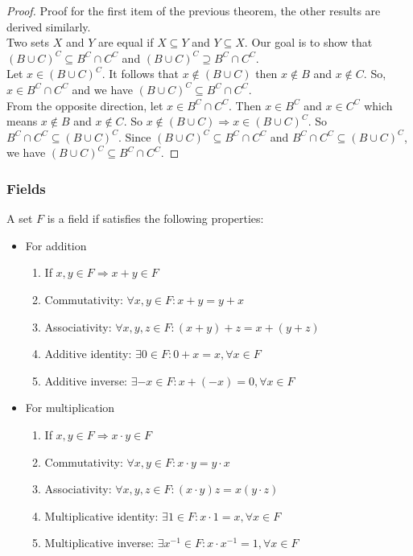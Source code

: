 \begin{proof}
    Proof for the first item of the previous theorem, the other results are derived similarly.\\
    Two sets $X$ and $Y$ are equal if $X \subseteq Y$ and $Y \subseteq X$. Our goal is to show that $(B \cup C)^C \subseteq B^C \cap C^C$ and $(B \cup C)^C \supseteq B^C \cap C^C$. \\
    Let $x \in (B \cup C)^C$. It follows that $x \notin (B \cup C)$ then $x \notin B$ and $x \notin C$. So, $x \in B^C \cap C^C$ and we have $(B \cup C)^C \subseteq B^C \cap C^C$. \\
    From the opposite direction, let  $x \in B^C \cap C^C$. Then $x \in B^C$ and $x \in C^C$ which means $x \notin B$ and $x \notin C$. So $x \notin (B \cup C) \Rightarrow x \in (B \cup C)^C$. So $B^C \cap C^C \subseteq (B \cup C)^C$.
    Since $(B \cup C)^C \subseteq B^C \cap C^C$ and $B^C \cap C^C \subseteq (B \cup C)^C$, we have $(B \cup C)^C \subseteq B^C \cap C^C$.
\end{proof}

\subsubsection{Fields}

\begin{definition}[Field]
    A set $F$ is a field if satisfies the following properties:
    \begin{itemize}
        \item For addition
            \begin{enumerate}
                \item If $x, y \in F \Rightarrow x + y \in F$
                \item Commutativity: $\forall x, y \in F: x + y = y + x$
                \item Associativity: $\forall x, y, z \in F: (x+y) + z = x + (y + z)$
                \item Additive identity: $\exists 0 \in F: 0 + x = x, \forall x \in F$
                \item Additive inverse: $\exists -x \in F: x + (-x) = 0, \forall x \in F$
            \end{enumerate}
        \item For multiplication
            \begin{enumerate}
                \item If $x, y \in F \Rightarrow x \cdot y \in F$
                \item Commutativity: $\forall x, y \in F: x \cdot y = y \cdot x$
                \item Associativity: $\forall x,y, z \in F: (x\cdot y) z = x (y \cdot z)$
                \item Multiplicative identity: $\exists 1 \in F: x \cdot 1 = x, \forall x \in F$
                \item Multiplicative inverse: $\exists x^{-1} \in F: x \cdot x^{-1} = 1, \forall x \in F$
            \end{enumerate}
    \end{itemize}
\end{definition}

